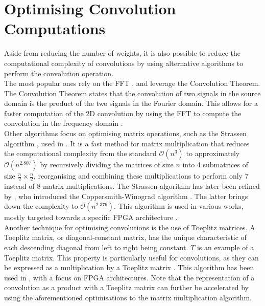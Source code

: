 \section{Optimising Convolution Computations}
\label{sec:sota:fast_convolutions}

Aside from reducing the number of weights, it is also possible to reduce the
computational complexity of convolutions by using alternative algorithms to
perform the convolution operation.\\

The most popular ones rely on the \ac{FFT}
\cite{DBLP:conf/nips/ChiJM20,DBLP:journals/npl/LinY19,DBLP:conf/pkdd/PrattWCZ17},
and leverage the Convolution Theorem. The Convolution Theorem states that the
convolution of two signals in the source domain is the product of the two
signals in the Fourier domain. This allows for a faster computation of the 2D
convolution by using the \ac{FFT} to compute the convolution in the frequency
domain \cite{oppenheim1997signals}.\\


Other algorithms focus on optimising matrix operations, such as the Strassen
algorithm \cite{strassen1969gaussian}, used in \cite{DBLP:conf/icann/CongX14}.
It is a fast method for matrix multiplication that reduces the computational
complexity from the standard $\mathcal{O}(n^{3})$ to approximately
$\mathcal{O}(n^{2.807})$ by recursively dividing the matrices of size $n$ into 4
submatrices of size $\frac{n}{2} \times \frac{n}{2}$, reorganising and combining
these multiplications to perform only 7 instead of 8 matrix multiplications. The
Strassen algorithm has later been refined by \citeauthor{coppersmith1987matrix},
who introduced the Coppersmith-Winograd algorithm \cite{coppersmith1987matrix}.
The latter brings down the complexity to $\mathcal{O}(n^{2.376})$. This
algorithm is used in various works, mostly targeted towards a specific \ac{FPGA}
architecture \cite{liu2018efficient,lu2018spwa,wang2020winonn}.\\


Another technique for optimising convolutions is the use of Toeplitz matrices. A
Toeplitz matrix, or diagonal-constant matrix, has the unique characteristic of
each descending diagonal from left to right being constant. $T$ is an example of
a Toeplitz matrix. This property is particularly useful for convolutions, as
they can be expressed as a multiplication by a Toeplitz matrix
\cite{gray2006toeplitz}. This algorithm has been used in
\cite{liao2019compressing}, with a focus on \ac{FPGA} architectures. Note that
the representation of a convolution as a product with a Toeplitz matrix can
further be accelerated by using the aforementioned optimisations to the matrix
multiplication algorithm.\\



